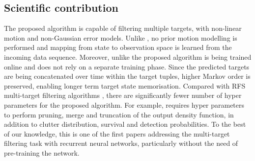 \documentclass[runningheads]{llncs}
\begin{document}
\subsection{Scientific contribution}

The proposed algorithm is capable of filtering multiple targets, with non-linear motion and non-Gaussian error models. Unlike \cite{Reuter:2014,Vo:2014}, no prior motion modelling is performed and mapping from state to observation space is learned from the incoming data sequence. {Moreover,} unlike \cite{Milan:2017} the proposed algorithm is being trained online and does not rely on a separate training {phase}.
Since the predicted targets are being concatenated over time within the target tuples, higher Markov order is preserved, enabling longer term target state memorisation. Compared with RFS multi-target filtering algorithms \cite{Reuter:2014,Vo:2014}, there are significantly fewer number of hyper parameters for the proposed algorithm. For example, \cite{Vo:2006} requires hyper parameters to perform pruning, merge and truncation of the output density function, in addition to clutter distribution, survival and detection probabilities. To the best of our knowledge, this is one of the first papers addressing the multi-target filtering task with recurrent neural networks, particularly without the need of pre-training the network.
\end{document}
